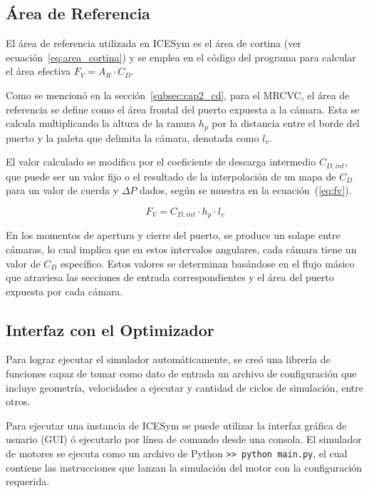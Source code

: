 

\subsection{Área de Referencia}

El área de referencia utilizada en ICESym es el área de cortina (ver
ecuación~\ref{eq:area_cortina}) y se emplea en el código del programa para
calcular el área efectiva $F_{V} = A_{R} \cdot C_{D}$.

Como se mencionó en la sección~\ref{subsec:cap2_cd}, para el MRCVC, el área de
referencia se define como el área frontal del puerto expuesta a la cámara.
%
Esta se calcula multiplicando la altura de la ranura $h_{p}$ por la distancia
entre el borde del puerto y la paleta que delimita la cámara, denotada como
$l_{v}$.

El valor calculado se modifica por el coeficiente de descarga intermedio $C_{D,int}$,
que puede ser un valor fijo o el resultado de la interpolación de un mapa de
$C_D$ para un valor de cuerda y $\Delta P$ dados, según se muestra en la
ecuación~(\ref{eq:fv}).

\begin{equation}\label{eq:fv}
    F_{V} = C_{D,int} \cdot h_{p} \cdot l_{v}
\end{equation}

En los momentos de apertura y cierre del puerto, se produce un solape entre
cámaras, lo cual implica que en estos intervalos angulares, cada cámara tiene un
valor de $C_D$ específico.
%
Estos valores se determinan basándose en el flujo másico que atraviesa las
secciones de entrada correspondientes y el área del puerto expuesta por cada
cámara.


\subsection{Interfaz con el Optimizador}
%
Para lograr ejecutar el simulador automáticamente, se creó una librería de
funciones capaz de tomar como dato de entrada un archivo de configuración que
incluye geometría, velocidades a ejecutar y cantidad de ciclos de simulación,
entre otros.

Para ejecutar una instancia de ICESym se puede utilizar la interfaz gráfica de
usuario (GUI) ó ejecutarlo por línea de comando desde una consola.
%
El simulador de motores se ejecuta como un archivo de Python {\tt>{}> python main.py}, el cual contiene las instrucciones que lanzan la simulación del
motor con la configuración requerida.
%

